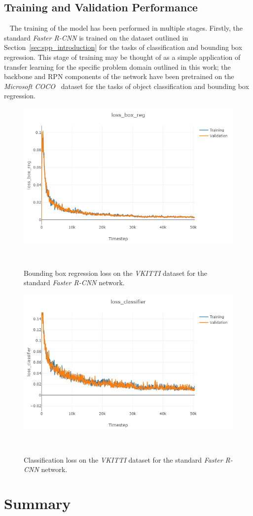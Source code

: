 \subsection{Training and Validation Performance}
~\label{sec:spp_quantitative_train}
The training of the model has been performed in multiple stages. Firstly, the standard \textit{Faster R-CNN} 
is trained on the dataset outlined in Section~\ref{sec:spp_introduction} for the tasks of classification and 
bounding box regression. This stage of training may be thought of as a simple application of transfer learning 
for the specific problem domain outlined in this work; the backbone and RPN components of the network 
have been pretrained on the \textit{Microsoft COCO}~\cite{Lin2014COCO} dataset for the tasks of object 
classification and bounding box regression.

\begin{figure}[!htbp]
  \centering
  \includegraphics[width=.6\linewidth]{figures/spp/quant/rcnn_pretrain/bb.png}
  \caption[VKITTI Bounding Box Training]{Bounding box regression loss on the \textit{VKITTI} 
  dataset for the standard \textit{Faster R-CNN} network.}
~\label{figure:spp_pretrain_bb}
\end{figure}

\begin{figure}[!htbp]
  \centering
  \includegraphics[width=.6\linewidth]{figures/spp/quant/rcnn_pretrain/cls.png}
  \caption[VKITTI Classification Training]{Classification loss on the \textit{VKITTI} 
  dataset for the standard \textit{Faster R-CNN} network.}
~\label{figure:spp_pretrain_cls}
\end{figure}

\section{Summary}
~\label{sec:spp_discussion}
